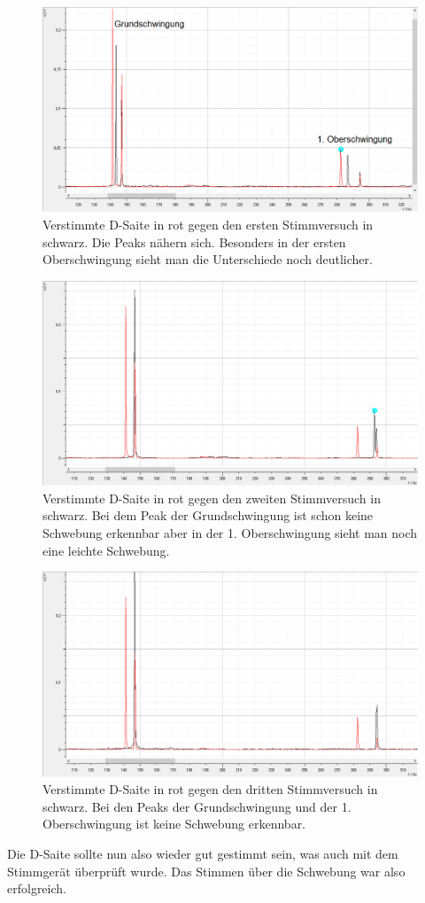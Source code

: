 \documentclass[12pt,a4paper]{article}
\begin{document}
\begin{figure}[H]
\centering
\includegraphics[scale=0.5]{Bilder/Verstimmt_vs_1_stimmen.png}
\caption{Verstimmte D-Saite in rot gegen den ersten Stimmversuch in schwarz. Die Peaks nähern sich. Besonders in der ersten Oberschwingung sieht man die Unterschiede noch deutlicher.}
\end{figure}

\begin{figure}[H]
\centering
\includegraphics[scale=0.5]{Bilder/Verstimmt_vs_2_stimmen.png}
\caption{Verstimmte D-Saite in rot gegen den zweiten Stimmversuch in schwarz. Bei dem Peak der Grundschwingung ist schon keine Schwebung erkennbar aber in der 1. Oberschwingung sieht man noch eine leichte Schwebung.}
\end{figure}

\begin{figure}[H]
\centering
\includegraphics[scale=0.5]{Bilder/Verstimmt_vs_3_stimmen.png}
\caption{Verstimmte D-Saite in rot gegen den dritten Stimmversuch in schwarz. Bei den Peaks der Grundschwingung und der 1. Oberschwingung ist keine Schwebung erkennbar.}
\end{figure}

Die D-Saite sollte nun also wieder gut gestimmt sein, was auch mit dem Stimmgerät überprüft wurde. Das Stimmen über die Schwebung war also erfolgreich.
\end{document}
